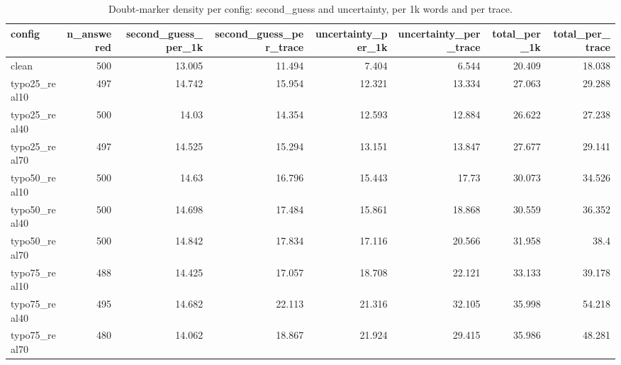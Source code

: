 \documentclass[11pt]{article}
\begin{document}
\begin{table}[H]
\centering
\caption{Doubt-marker density per config: second\_guess and uncertainty, per 1k words and per trace.}
\small
\begin{adjustbox}{max width=\textwidth}
\begin{tabular}{lrrrrrrr}
\toprule
\textbf{config} & \textbf{n\_answered} & \textbf{second\_guess\_per\_1k} & \textbf{second\_guess\_per\_trace} & \textbf{uncertainty\_per\_1k} & \textbf{uncertainty\_per\_trace} & \textbf{total\_per\_1k} & \textbf{total\_per\_trace} \\
\midrule
clean & 500 & 13.005 & 11.494 & 7.404 & 6.544 & 20.409 & 18.038 \\
typo25\_real10 & 497 & 14.742 & 15.954 & 12.321 & 13.334 & 27.063 & 29.288 \\
typo25\_real40 & 500 & 14.03 & 14.354 & 12.593 & 12.884 & 26.622 & 27.238 \\
typo25\_real70 & 497 & 14.525 & 15.294 & 13.151 & 13.847 & 27.677 & 29.141 \\
typo50\_real10 & 500 & 14.63 & 16.796 & 15.443 & 17.73 & 30.073 & 34.526 \\
typo50\_real40 & 500 & 14.698 & 17.484 & 15.861 & 18.868 & 30.559 & 36.352 \\
typo50\_real70 & 500 & 14.842 & 17.834 & 17.116 & 20.566 & 31.958 & 38.4 \\
typo75\_real10 & 488 & 14.425 & 17.057 & 18.708 & 22.121 & 33.133 & 39.178 \\
typo75\_real40 & 495 & 14.682 & 22.113 & 21.316 & 32.105 & 35.998 & 54.218 \\
typo75\_real70 & 480 & 14.062 & 18.867 & 21.924 & 29.415 & 35.986 & 48.281 \\
\bottomrule
\end{tabular}
\end{adjustbox}
\end{table}
\end{document}
